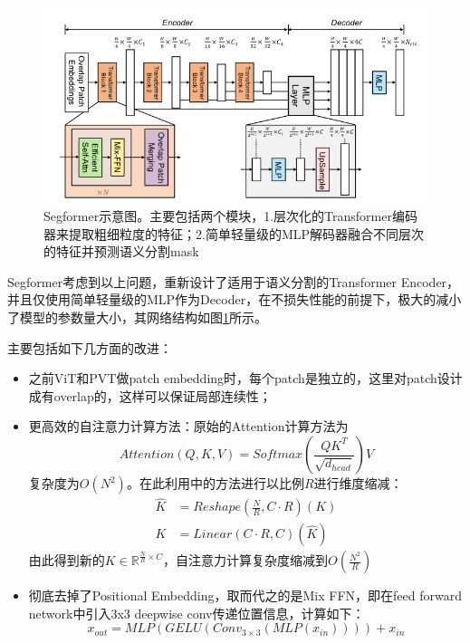 \documentclass[cn,12pt,color=mine,scheme=chinese,bibstyle=gb7714-2015]{elegantbook}
\begin{document}
\begin{figure}[h]
	\centering
	\includegraphics[width=.85\linewidth]{images/segformer}
	\caption{Segformer示意图。主要包括两个模块，1.层次化的Transformer编码器来提取粗细粒度的特征；2.简单轻量级的MLP解码器融合不同层次的特征并预测语义分割mask}
	\label{segformer}
\end{figure}

Segformer\cite{xie2021segformer}考虑到以上问题，重新设计了适用于语义分割的Transformer Encoder，并且仅使用简单轻量级的MLP作为Decoder，在不损失性能的前提下，极大的减小了模型的参数量大小，其网络结构如图\ref{segformer}所示。

\begin{note}
	主要包括如下几方面的改进：
	\begin{itemize}
		\item 之前ViT和PVT做patch embedding时，每个patch是独立的，这里对patch设计成有overlap的，这样可以保证局部连续性；
		\item 更高效的自注意力计算方法：原始的Attention计算方法为
		\begin{equation}
			Attention(Q,K,V)=Softmax(\frac{QK^T}{\sqrt{d_{head}}})V
		\end{equation}
		复杂度为$O(N^2)$。在此利用\cite{wang2021pyramid}中的方法进行以比例$R$进行维度缩减：
		\begin{equation}\begin{aligned}
			\hat{K}&=Reshape(\frac{N}{R},C\cdot R)(K) \\
			K&=Linear(C\cdot R,C)(\hat{K})
		\end{aligned}\end{equation}
		由此得到新的$K\in\mathbb{R}^{\frac{N}{R}\times C}$，自注意力计算复杂度缩减到$O(\frac{N^2}{R})$
		\item 彻底去掉了Positional Embedding，取而代之的是Mix FFN，即在feed forward network中引入3x3 deepwise conv传递位置信息，计算如下：
		\begin{equation}
			x_{out}=MLP(GELU(Conv_{3\times3}(MLP(x_{in}))))+x_{in}
		\end{equation}
	\end{itemize}
\end{note}
\end{document}
